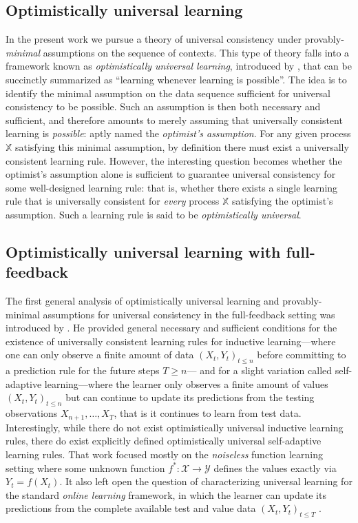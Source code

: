 \documentclass[aos]{imsart}
\theoremstyle{plain}
\theoremstyle{remark}
\newcommand{\Xcal}{\mathcal{X}}
\newcommand{\Ycal}{\mathcal{Y}}
\newcommand{\1}{\mathbbm{1}}%
\newcommand{\ProcX}{\mathbb{X}}
\begin{document}
\subsection{Optimistically universal learning}
In the present work we pursue a theory of universal consistency under provably-\emph{minimal} assumptions on the sequence of contexts.
This type of theory falls into a framework known as \emph{optimistically universal learning}, 
introduced by \citep*{hanneke:21}, that can be succinctly summarized as ``learning whenever learning is possible''.
The idea is to identify the minimal assumption on the data sequence sufficient for universal consistency to be possible.
Such an assumption is then both necessary and sufficient, and therefore amounts to merely assuming 
that universally consistent learning is \emph{possible}: aptly named the \emph{optimist's assumption}.
For any given process $\ProcX$ satisfying this minimal assumption, by definition there must exist a 
universally consistent learning rule. However, the interesting question becomes whether 
the optimist's assumption alone is sufficient to guarantee universal consistency for some well-designed learning rule: 
that is, whether there exists a single learning rule that is universally consistent 
for \emph{every} process $\ProcX$ satisfying the optimist's assumption.
Such a learning rule is said to be \emph{optimistically universal}.

\subsection{Optimistically universal learning with full-feedback}

The first general analysis of optimistically universal learning and provably-minimal assumptions for universal consistency in the full-feedback setting was introduced by \citep*{hanneke:21}. He provided general necessary and sufficient conditions 
for the existence of universally consistent learning rules for inductive learning---where one can only observe a finite amount of data $(X_t,Y_t)_{t\leq n}$ before committing to a prediction rule for the future steps $T\geq n$---
and for a slight variation called self-adaptive learning---where the learner only observes a finite amount of values $(X_t,Y_t)_{t\leq n}$ but can continue to update its predictions from the testing observations $X_{n+1},\ldots,X_T$, that is it continues to learn from test data. Interestingly, while there do not exist optimistically universal inductive learning rules, 
there do exist explicitly defined optimistically universal self-adaptive learning rules.
That work focused mostly on the \emph{noiseless} function learning setting where some unknown function $f^*:\Xcal\to\Ycal$ defines the values exactly via $Y_t=f(X_t)$. It also left open the question of characterizing universal learning for the standard \emph{online learning} framework, in which the learner can update its predictions from the complete available test and value data $(X_t, Y_t)_{t\leq T}$ \citep*[see also][]{hanneke:21c}.
\end{document}
